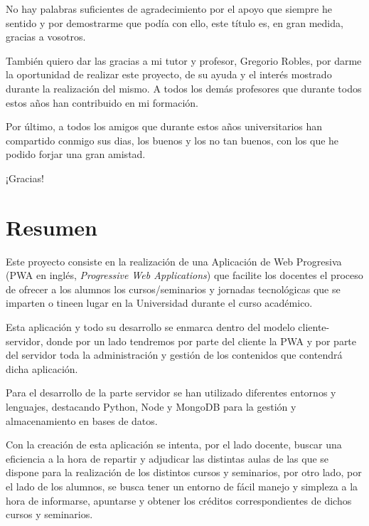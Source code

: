 \documentclass[a4paper, 12pt]{book}
\begin{document}
	No hay palabras suficientes de agradecimiento por el apoyo que siempre he sentido y por demostrarme que podía con ello, este título es, en gran medida, gracias a vosotros.

	También quiero dar las gracias a mi tutor y profesor, Gregorio Robles, por darme la oportunidad de realizar este proyecto, de su ayuda y el interés mostrado durante la realización del mismo.
A todos los demás profesores que durante todos estos años han contribuido en mi formación.

	Por último, a todos los amigos que durante estos años universitarios han compartido conmigo sus dias, los buenos y los no tan buenos, con los que he podido forjar una gran amistad.

	\vspace{5mm} %
	¡Gracias!



\chapter*{Resumen}

	Este proyecto consiste en la realización de una Aplicación de Web Progresiva (PWA en inglés, \emph{Progressive Web Applications}) que facilite los docentes el proceso de ofrecer a los alumnos los cursos/seminarios y jornadas tecnológicas que se imparten o tineen lugar en la Universidad durante el curso académico.
	
	Esta aplicación y todo su desarrollo se enmarca dentro del modelo cliente-servidor, donde por un lado tendremos por parte del cliente la PWA y por parte del servidor toda la administración y gestión de los contenidos que contendrá dicha aplicación.
	
	Para el desarrollo de la parte servidor se han utilizado diferentes entornos y lenguajes, destacando Python, Node y MongoDB para la gestión y almacenamiento en bases de datos.
	
	Con la creación de esta aplicación se intenta, por el lado docente, buscar una eficiencia a la hora de repartir y adjudicar las distintas aulas de las que se dispone para la realización de los distintos cursos y seminarios, por otro lado, por el lado de los alumnos, se busca tener un entorno de fácil manejo y simpleza a la hora de informarse, apuntarse y obtener los créditos correspondientes de dichos cursos y seminarios.
\end{document}
